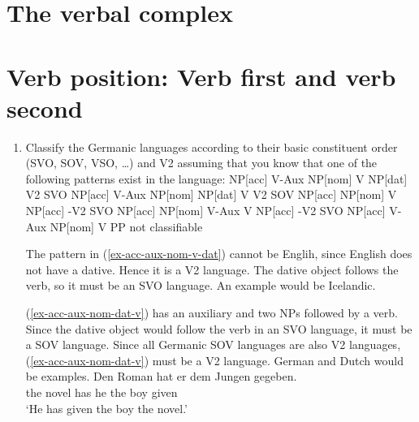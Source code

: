 \clearpage

\section{The verbal complex}

\section{Verb position: Verb first and verb second}



\begin{enumerate}
\item Classify the Germanic languages according to their basic constituent order (SVO, SOV, VSO,
  \ldots) and V2 assuming that you know that one of the following patterns exist in the language:
\eal
\label{ex-v2-task-solution}
\ex 
\label{ex-acc-aux-nom-v-dat}
NP[acc] V-Aux NP[nom] V NP[dat]   \hfill  V2 SVO 
\ex
\label{ex-acc-aux-nom-dat-v} 
NP[acc] V-Aux NP[nom] NP[dat] V   \hfill  V2 SOV
\ex 
\label{ex-acc-nom-v-acc}
NP[acc] NP[nom] V NP[acc]         \hfill -V2 SVO
\ex 
\label{ex-acc-nom-aux-v-acc}
NP[acc] NP[nom] V-Aux V NP[acc]   \hfill -V2 SVO
\ex 
\label{ex-acc-aux-nom-v-pp}
NP[acc] V-Aux NP[nom] V PP        \hfill not classifiable
\zl

The pattern in (\ref{ex-acc-aux-nom-v-dat}) cannot be Englih, since English does not have a dative. Hence it is a V2
language. The dative object follows the verb, so it must be an SVO language. An example would be Icelandic.
\ea

\z

(\ref{ex-acc-aux-nom-dat-v}) has an auxiliary and two NPs followed by a verb. Since the dative object would follow the verb
in an SVO language, it must be a SOV language. Since all Germanic SOV languages are also V2
languages, (\ref{ex-acc-aux-nom-dat-v}) must be a V2 language. German and Dutch would be examples.
\ea
\gll Den Roman hat er dem Jungen gegeben.\\
     the novel has he the boy given\\
\glt `He has given the boy the novel.'
\z


\end{enumerate}
